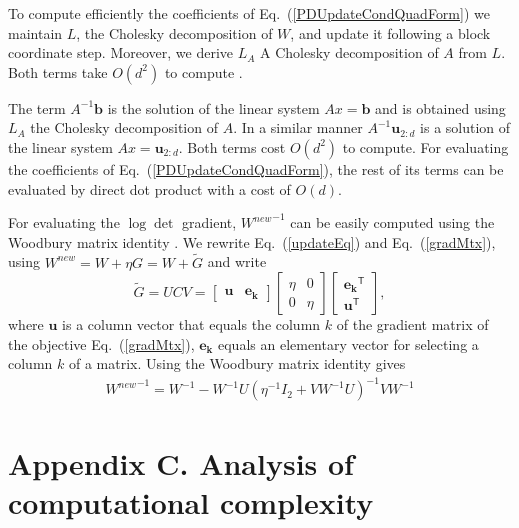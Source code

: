 \documentclass[twoside,11pt]{article}
\newcommand\mat[1]{{#1}}
\renewcommand\vec[1]{\mathbf{#1}}
\newcommand{\T}{{}^\mathsf{T}}
\newcommand{\W}{\mat{W}}
\newcommand{\newW}{{\mat{W^{new}}}}
\newcommand{\cholL}{\mat{L}}
\newcommand{\A}{\mat{A}}
\newcommand{\B}{\vec{b}}
\newcommand{\invA}{A^{-1}}
\newcommand{\uvec}{\vec{u}_{2:d}}
\renewcommand{\eqref}[1]{Eq.~(\ref{#1})}
\begin{document}
To compute efficiently the coefficients of \eqref{PDUpdateCondQuadForm} we maintain $\cholL$, the Cholesky decomposition of $\W$, and update it following a block coordinate step. Moreover, we derive $\cholL_A$ A Cholesky decomposition of $A$ from $\cholL$. Both terms take $O(d^2)$ to compute \citep{Davis05rowchol}.

The term $\invA \B$ is the solution of the linear system $\A x = \B$ and is obtained using $\cholL_A$ the Cholesky decomposition of $\A$. In a similar manner $\invA \uvec$ is a solution of the linear system $\A x = \uvec$. Both terms cost $O(d^2)$ to compute. For evaluating the coefficients of \eqref{PDUpdateCondQuadForm}, the rest of its terms can be evaluated by direct dot product with a cost of $O(d)$. 

For evaluating the $\log\det$ gradient, $\newW^{-1}$ can be easily computed using the Woodbury matrix
identity \citep{woodbury1950inverting}. We rewrite \eqref{updateEq} and \eqref{gradMtx}, using $\newW = \W + \eta G = \W+\mat{\widetilde{G}}$
and write
\begin{equation}
  \mat{\widetilde{G}} = \mat{U}\mat{C}\mat{V} = \left[ \begin{matrix}
      \vec{u} & \vec{e_k} \end{matrix} \right] \left[ \begin{matrix}
      \eta & 0 \\ 0 & \eta \end{matrix} \right] \left[ \begin{matrix}
      \vec{e_k}\T \\ \vec{u}\T \end{matrix} \right],
  \label{gradMtxWDB}
  \nonumber 
\end{equation}
where $\vec{u}$ is a column vector that equals the column $k$ of the gradient matrix of the objective \eqref{gradMtx},
$\vec{e_k}$ equals an elementary vector for selecting a column $k$ of
a matrix. 
Using the Woodbury matrix identity gives 
\begin{equation}
    \begin{array}{lcl}
    \newW^{-1} = 
    \W^{-1} - \W^{-1} \mat{U} (\eta^{-1} I_2 + \mat{V}     \W^{-1} \mat{U})^{-1} \mat{V} \W^{-1}
    \end{array}
    \nonumber
    \label{InvWwdb}
\end{equation}

 

\section*{Appendix C. Analysis of computational complexity}
\end{document}

